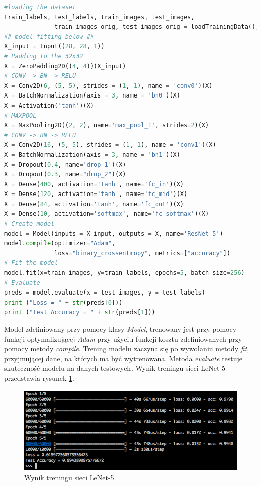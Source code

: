 \begin{lstlisting}[language=Python, caption={Model sieci LeNet-5 w Keras.}, label={lst:lenet5keras}, captionpos=b]
#loading the dataset
train_labels, test_labels, train_images, test_images, 
              train_images_orig, test_images_orig = loadTrainingData();
## model fitting below ##
X_input = Input((28, 28, 1))
# Padding to the 32x32
X = ZeroPadding2D((4, 4))(X_input)
# CONV -> BN -> RELU
X = Conv2D(6, (5, 5), strides = (1, 1), name = 'conv0')(X)
X = BatchNormalization(axis = 3, name = 'bn0')(X)
X = Activation('tanh')(X)
# MAXPOOL
X = MaxPooling2D((2, 2), name='max_pool_1', strides=2)(X)
# CONV -> BN -> RELU
X = Conv2D(16, (5, 5), strides = (1, 1), name = 'conv1')(X)
X = BatchNormalization(axis = 3, name = 'bn1')(X)
X = Dropout(0.4, name='drop_1')(X)
X = Dropout(0.3, name="drop_2")(X)
X = Dense(400, activation='tanh', name='fc_in')(X)
X = Dense(120, activation='tanh', name='fc_mid')(X)
X = Dense(84, activation='tanh', name='fc_out')(X)
X = Dense(10, activation='softmax', name='fc_softmax')(X)
# Create model
model = Model(inputs = X_input, outputs = X, name='ResNet-5')
model.compile(optimizer="Adam", 
              loss="binary_crossentropy", metrics=["accuracy"])
# Fit the model
model.fit(x=train_images, y=train_labels, epochs=5, batch_size=256)
# Evaluate
preds = model.evaluate(x = test_images, y = test_labels)
print ("Loss = " + str(preds[0]))
print ("Test Accuracy = " + str(preds[1]))
\end{lstlisting}

Model zdefiniowany przy pomocy klasy \textit{Model}, trenowany jest przy pomocy funkcji optymalizującej \textit{Adam} przy użyciu funkcji 
kosztu  zdefiniowanych przy pomocy metody \textit{compile}. Trening modelu zaczyna się po wywołaniu metody \textit{fit}, przyjmującej dane, na których ma być wytrenowana.
Metoda \textit{evaluate} testuje skuteczność modelu na danych testowych. Wynik treningu sieci LeNet-5 przedstawia rysunek \ref{fig:lenet5-training}.

\begin{figure}[ht]
\centerline{\includegraphics[scale=0.5]{resources/training_lenet5.png}}
\caption{Wynik treningu sieci LeNet-5.}
\label{fig:lenet5-training}
\end{figure}

